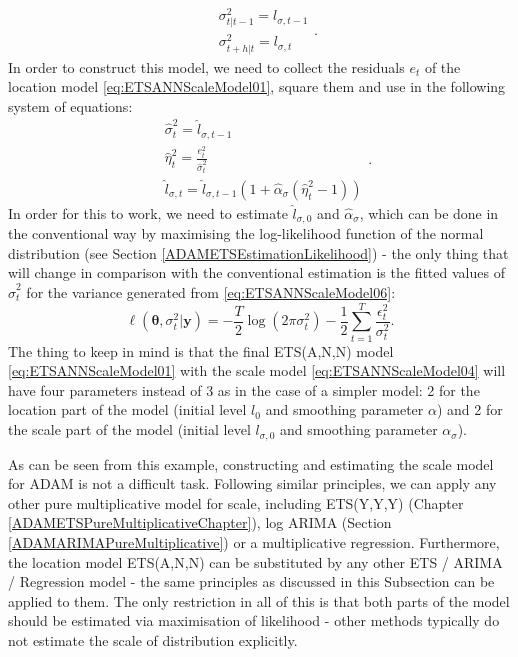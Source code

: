 \documentclass[
]{book}
\theoremstyle{definition}
\theoremstyle{definition}
\theoremstyle{definition}
\theoremstyle{definition}
\theoremstyle{remark}
\begin{document}
\begin{equation}
  \begin{aligned}
    &\sigma_{t|t-1}^2 = l_{\sigma,t-1} \\
    &\sigma_{t+h|t}^2 = l_{\sigma,t} 
  \end{aligned}.
  \label{eq:ETSANNScaleModel05}
\end{equation}
In order to construct this model, we need to collect the residuals \(e_t\) of the location model \eqref{eq:ETSANNScaleModel01}, square them and use in the following system of equations:
\begin{equation}
  \begin{aligned}
    &\hat{\sigma}^2_{t} = \hat{l}_{\sigma,t-1} \\
    &\hat{\eta}_t^2 = \frac{e_t^2}{\hat{\sigma}^2_{t}} \\
    &\hat{l}_{\sigma,t} = \hat{l}_{\sigma,t-1} (1 + \hat{\alpha}_\sigma (\hat{\eta}_t^2-1))
  \end{aligned}.
  \label{eq:ETSANNScaleModel06}
\end{equation}
In order for this to work, we need to estimate \(\hat{l}_{\sigma,0}\) and \(\hat{\alpha}_\sigma\), which can be done in the conventional way by maximising the log-likelihood function of the normal distribution (see Section \ref{ADAMETSEstimationLikelihood}) - the only thing that will change in comparison with the conventional estimation is the fitted values of \(\hat{\sigma}^2_{t}\) for the variance generated from \eqref{eq:ETSANNScaleModel06}:
\begin{equation}
    \ell(\boldsymbol{\theta}, {\sigma}_t^2 | \mathbf{y}) = -\frac{T}{2} \log(2 \pi \sigma_t^2) -\frac{1}{2} \sum_{t=1}^T \frac{\epsilon_t^2}{\sigma_t^2} .
  \label{eq:ETSANNScaleModelLogLik}
\end{equation}
The thing to keep in mind is that the final ETS(A,N,N) model \eqref{eq:ETSANNScaleModel01} with the scale model \eqref{eq:ETSANNScaleModel04} will have four parameters instead of 3 as in the case of a simpler model: 2 for the location part of the model (initial level \(l_{0}\) and smoothing parameter \(\alpha\)) and 2 for the scale part of the model (initial level \(l_{\sigma,0}\) and smoothing parameter \(\alpha_\sigma\)).

As can be seen from this example, constructing and estimating the scale model for ADAM is not a difficult task. Following similar principles, we can apply any other pure multiplicative model for scale, including ETS(Y,Y,Y) (Chapter \ref{ADAMETSPureMultiplicativeChapter}), log ARIMA (Section \ref{ADAMARIMAPureMultiplicative}) or a multiplicative regression. Furthermore, the location model ETS(A,N,N) can be substituted by any other ETS / ARIMA / Regression model - the same principles as discussed in this Subsection can be applied to them. The only restriction in all of this is that both parts of the model should be estimated via maximisation of likelihood - other methods typically do not estimate the scale of distribution explicitly.
\end{document}
